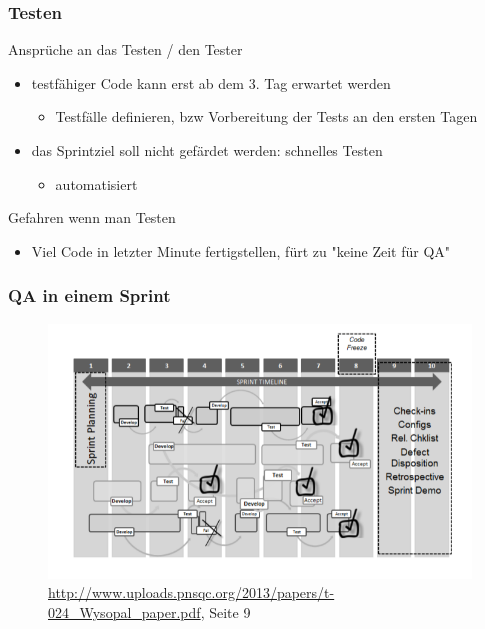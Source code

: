 \documentclass{beamer}
\begin{document}
\begin{frame}
\frametitle{Testen}
\begin{block}{Ansprüche an das Testen / den Tester}
	\begin{itemize}
		\item testfähiger Code kann erst ab dem 3. Tag erwartet werden
		\begin{itemize}
			\item Testfälle definieren, bzw Vorbereitung der Tests an den ersten Tagen
		\end{itemize}
		\item das Sprintziel soll nicht gefärdet werden: schnelles Testen
		\begin{itemize}
			\item automatisiert
		\end{itemize}
	\end{itemize}
\end{block}
\begin{block}{Gefahren wenn man Testen}
	\begin{itemize}
		\item Viel Code in letzter Minute fertigstellen, fürt zu "keine Zeit für QA"
	\end{itemize}
\end{block}
\end{frame}

\begin{frame}
\frametitle{QA in einem Sprint}
\begin{figure}
	\includegraphics[scale=0.6]{./presGraphics/sprintQA}
	\caption{\url{http://www.uploads.pnsqc.org/2013/papers/t-024_Wysopal_paper.pdf}, Seite 9}
\end{figure}
\end{frame}
\end{document}
